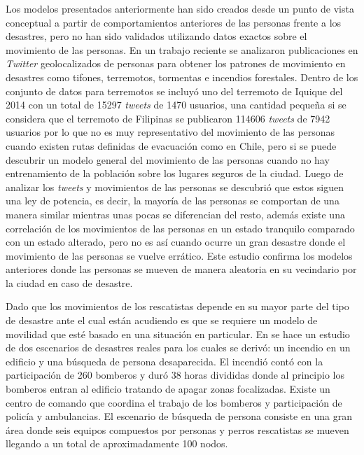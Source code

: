 Los modelos presentados anteriormente han sido creados desde un punto de vista
conceptual a partir de comportamientos anteriores de las personas frente a los
desastres, pero no han sido validados utilizando datos exactos sobre el
movimiento de las personas. En un trabajo reciente
\cite{10.1371/journal.pone.0147299} se analizaron publicaciones en
\textit{Twitter} geolocalizados de personas para obtener los patrones de
movimiento en desastres como tifones, terremotos, tormentas e incendios
forestales.  Dentro de los conjunto de datos para terremotos se incluyó uno del
terremoto de Iquique del 2014 con un total de 15297 \textit{tweets} de 1470
usuarios, una cantidad pequeña si se considera que el terremoto de Filipinas se
publicaron 114606 \textit{tweets} de 7942 usuarios por lo que no es muy
representativo del movimiento de las personas cuando existen rutas definidas de
evacuación como en Chile, pero si se puede descubrir un modelo general del
movimiento de las personas cuando no hay entrenamiento de la población sobre los
lugares seguros de la ciudad. Luego de analizar los \textit{tweets} y
movimientos de las personas se descubrió que estos siguen una ley de potencia,
es decir, la mayoría de las personas se comportan de una manera similar mientras
unas pocas se diferencian del resto, además existe una correlación de los
movimientos de las personas en un estado tranquilo comparado con un estado
alterado, pero no es así cuando ocurre un gran desastre donde el movimiento de
las personas se vuelve errático. Este estudio confirma los modelos anteriores
donde las personas se mueven de manera aleatoria en su vecindario por la ciudad
en caso de desastre.


Dado que los movimientos de los rescatistas depende en su mayor parte del tipo
de desastre ante el cual están acudiendo es que se requiere un modelo de
movilidad que esté basado en una situación en particular. En
\cite{krug_movement_2014} se hace un estudio de dos escenarios de desastres
reales para los cuales se derivó: un incendio en un edificio y una búsqueda de
persona desaparecida. El incendió contó con la participación de 260 bomberos y
duró 38 horas divididas donde al principio los bomberos entran al edificio
tratando de apagar zonas focalizadas. Existe un centro de comando que
coordina el trabajo de los bomberos y participación de policía y ambulancias. El
escenario de búsqueda de persona consiste en una gran área donde seis equipos
compuestos por personas y perros rescatistas se mueven llegando a un total de
aproximadamente 100 nodos. 



